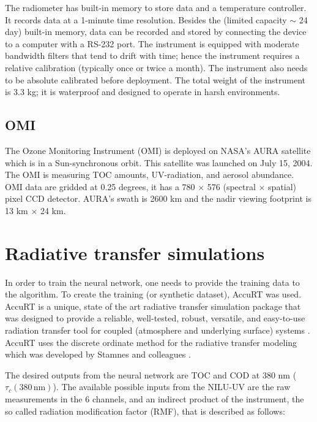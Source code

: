 \documentclass{optica-article}
\begin{document}
The radiometer has built-in memory to store data and a temperature controller. 
It records data at a 1-minute time resolution. 
Besides the (limited capacity $\sim$ 24 day) built-in memory, data can be recorded and stored by connecting the device to a computer with a RS-232 port. 
The instrument is equipped with moderate bandwidth filters that tend to drift with time; hence the instrument requires a relative calibration (typically once or twice a month). 
The instrument also needs to be absolute calibrated before deployment. 
The total weight of the instrument is 3.3 kg; it is waterproof and designed to operate in harsh environments.

\subsection{OMI}
\label{sec-omi}

The Ozone Monitoring Instrument (OMI) is deployed on NASA’s AURA satellite which is in a Sun-synchronous orbit. 
This satellite was launched on July 15, 2004. 
The OMI is measuring TOC amounts, UV-radiation, and aerosol abundance. 
OMI data are gridded at 0.25 degrees, it has a 780 × 576 (spectral × spatial) pixel CCD detector. 
AURA’s swath is 2600 km and the nadir viewing footprint is 13 km × 24 km.


\section{Radiative transfer simulations}	
\label{sec-simulations}

In order to train the neural network, one needs to provide the training data to the algorithm. 
To create the training (or synthetic dataset), AccuRT was used. 
AccuRT is a unique, state of the art radiative transfer simulation package that was designed to provide a reliable, well-tested, robust, versatile, and easy-to-use radiation transfer tool for coupled (atmosphere and underlying surface) systems {\cite{Knut:2018}}. 
AccuRT uses the discrete ordinate method for the radiative transfer modeling which was developed by Stamnes and colleagues \cite{Knut:1988}.

The desired outputs from the neural network are TOC and COD at 380 nm ($\tau_c{\scriptstyle(380 \, \text{nm})}$).  
The available possible inputs from the NILU-UV are the raw measurements in the 6 channels, and an indirect product of the instrument, the so called radiation modification factor (RMF), that is described as follows:
\end{document}
